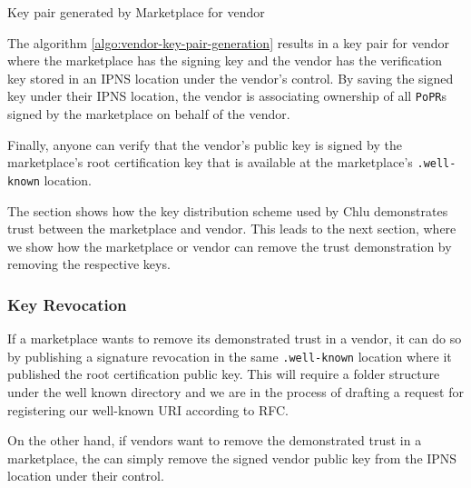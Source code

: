 \documentclass[a4paper]{article}
\begin{document}
\begin{algorithm}
  \caption{Key pair generated by Marketplace for vendor}\label{algo:vendor-key-pair-generation}
  \begin{algorithmic}
  \end{algorithmic}    
\end{algorithm}

The algorithm \ref{algo:vendor-key-pair-generation} results in a key
pair for vendor where the marketplace has the signing key and the
vendor has the verification key stored in an IPNS location under the
vendor's control. By saving the signed key under their IPNS location,
the vendor is associating ownership of all \texttt{PoPR}s signed by
the marketplace on behalf of the vendor.

Finally, anyone can verify that the vendor's public key is signed by
the marketplace's root certification key that is available at the
marketplace's \texttt{.well-known} location.

The section shows how the key distribution scheme used by Chlu
demonstrates trust between the marketplace and vendor. This leads to
the next section, where we show how the marketplace or vendor can
remove the trust demonstration by removing the respective keys.

\subsubsection{Key Revocation}\label{sec:key-revocation}

If a marketplace wants to remove its demonstrated trust in a vendor,
it can do so by publishing a signature revocation in the same
\texttt{.well-known} location where it published the root
certification public key. This will require a folder structure under
the well known directory and we are in the process of drafting a
request for registering our well-known URI according to
RFC\cite{wellknown}.

On the other hand, if vendors want to remove the demonstrated trust in
a marketplace, the can simply remove the signed vendor public key from
the IPNS location under their control.
\end{document}
